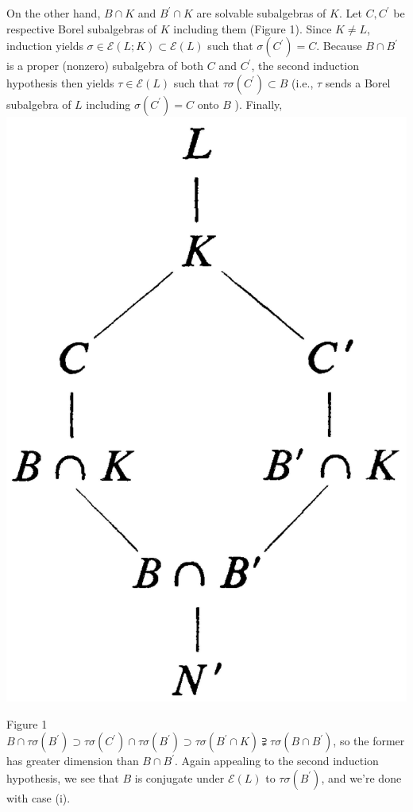 \documentclass[10pt]{article}
\begin{document}
On the other hand, $B \cap K$ and $B^{\prime} \cap K$ are solvable subalgebras of $K$. Let $C, C^{\prime}$ be respective Borel subalgebras of $K$ including them (Figure 1). Since $K \neq L$, induction yields $\sigma \in \mathscr{E}(L ; K) \subset \mathscr{E}(L)$ such that $\sigma\left(C^{\prime}\right)=C$. Because $B \cap B^{\prime}$ is a proper (nonzero) subalgebra of both $C$ and $C^{\prime}$, the second induction hypothesis then yields $\tau \in \mathscr{E}(L)$ such that $\tau \sigma\left(C^{\prime}\right) \subset B$ (i.e., $\tau$ sends a Borel subalgebra of $L$ including $\sigma\left(C^{\prime}\right)=C$ onto $B$ ). Finally,\\
\includegraphics[max width=\textwidth, center]{2025_06_06_fac2836a92464059da43g-098}

Figure 1\\
$B \cap \tau \sigma\left(B^{\prime}\right) \supset \tau \sigma\left(C^{\prime}\right) \cap \tau \sigma\left(B^{\prime}\right) \supset \tau \sigma\left(B^{\prime} \cap K\right) \supsetneqq \tau \sigma\left(B \cap B^{\prime}\right)$, so the former has greater dimension than $B \cap B^{\prime}$. Again appealing to the second induction hypothesis, we see that $B$ is conjugate under $\mathscr{E}(L)$ to $\tau \sigma\left(B^{\prime}\right)$, and we're done with case (i).
\end{document}
